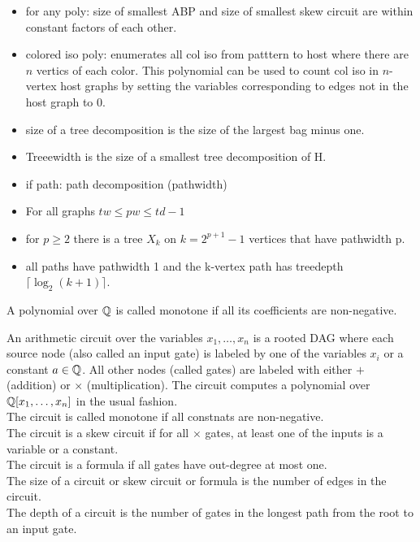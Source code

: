 \begin{itemize}
    \item for any poly: size of smallest ABP and size of smallest skew circuit are within constant factors of each other.
    \item colored iso poly: enumerates all col iso from patttern to host where there are $n$ vertics of each color. This polynomial can be used to count col iso in $n$-vertex host graphs by setting the variables corresponding to edges not in the host graph to $0$.
    \item size of a tree decomposition is the size of the largest bag minus one.
    \item Treeewidth is the size of a smallest tree decomposition of H.
    \item if path: path decomposition (pathwidth)
    \item For all graphs $tw \leq pw \leq td - 1$
    \item for $p\geq 2$ there is a tree $X_k$ on $k=2^{p+1}-1$ vertices that have pathwidth p.
    \item all paths have pathwidth 1 and the k-vertex path has treedepth $\lceil \log_2(k+1)\rceil$.
\end{itemize}


\begin{definition}\label{def:mono}
    A polynomial over $\mathbb{Q}$ is called monotone if all its coefficients are non-negative.
\end{definition}

\begin{definition}\label{def:ari-circ}
    An arithmetic circuit over the variables $x_1,\dots,x_n$ is a rooted DAG  where each source node (also called an input gate) is labeled by one of the variables $x_i$ or a constant $a\in\mathbb{Q}$. All other nodes (called gates) are labeled with either $+$ (addition) or $\times$ (multiplication). The circuit computes a polynomial over $\mathbb{Q}[x_1,\dots,x_n]$ in the usual fashion.\\
    The circuit is called monotone if all constnats are non-negative.\\
    The circuit is a skew circuit if for all $\times$ gates, at least one of the inputs is a variable or a constant.\\
    The circuit is a formula if all gates have out-degree at most one.\\
    The size of a circuit or skew circuit or formula is the number of edges in the circuit.\\
    The depth of a circuit is the number of gates in the longest path from the root to an input gate.
\end{definition}

